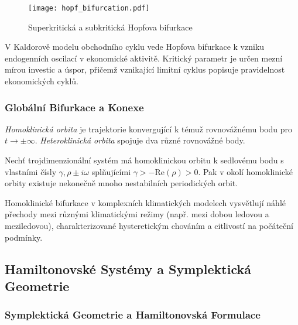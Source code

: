 \begin{figure}[H]
\centering
\texttt{[image: hopf\_bifurcation.pdf]}
\caption{Superkritická a subkritická Hopfova bifurkace}
\label{fig:hopf_bifurcation}
\end{figure}

\begin{application}
V Kaldorově modelu obchodního cyklu vede Hopfova bifurkace k vzniku endogenních oscilací v ekonomické aktivitě. Kritický parametr je určen mezní mírou investic a úspor, přičemž vznikající limitní cyklus popisuje pravidelnost ekonomických cyklů.
\end{application}

\subsubsection{Globální Bifurkace a Konexe}

\begin{definition}
\emph{Homoklinická orbita} je trajektorie konvergující k témuž rovnovážnému bodu pro $t \to \pm\infty$. \emph{Heteroklinická orbita} spojuje dva různé rovnovážné body.
\end{definition}

\begin{theorem}
Nechť trojdimenzionální systém má homoklinickou orbitu k sedlovému bodu s vlastními čísly $\gamma, \rho \pm i\omega$ splňujícími $\gamma > -\mathrm{Re}(\rho) > 0$. Pak v okolí homoklinické orbity existuje nekonečně mnoho nestabilních periodických orbit.
\end{theorem}

\begin{application}
Homoklinické bifurkace v komplexních klimatických modelech vysvětlují náhlé přechody mezi různými klimatickými režimy (např. mezi dobou ledovou a meziledovou), charakterizované hysteretickým chováním a citlivostí na počáteční podmínky.
\end{application}

\spc

\subsection{Hamiltonovské Systémy a Symplektická Geometrie}

\subsubsection{Symplektická Geometrie a Hamiltonovská Formulace}

